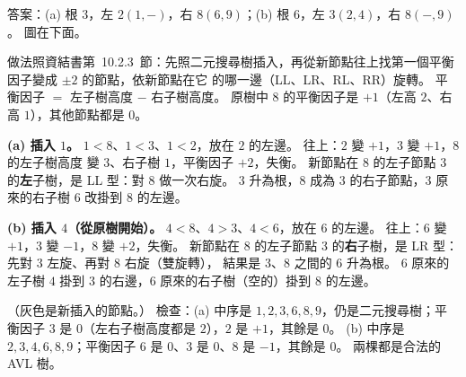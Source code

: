 \begin{pastsoln}
答案：(a) 根 $3$，左 $2(1, -)$，右 $8(6, 9)$；(b) 根 $6$，左 $3(2, 4)$，右 $8(-, 9)$。 圖在下面。

做法照資結書第~10.2.3~節：先照二元搜尋樹插入，再從新節點往上找第一個平衡因子變成 $\pm 2$ 的節點，依新節點在它
的哪一邊（LL、LR、RL、RR）旋轉。 平衡因子 $= $ 左子樹高度 $-$ 右子樹高度。 原樹中 $8$ 的平衡因子是 $+1$（左高
$2$、右高 $1$），其他節點都是 $0$。

\textbf{(a) 插入 $1$。} $1 < 8$、$1 < 3$、$1 < 2$，放在 $2$ 的左邊。 往上：$2$ 變 $+1$，$3$ 變 $+1$，$8$ 的左子樹高度
變 $3$、右子樹 $1$，平衡因子 $+2$，失衡。 新節點在 $8$ 的左子節點 $3$ 的\textbf{左}子樹，是 LL 型：對 $8$ 做一次右旋。
$3$ 升為根，$8$ 成為 $3$ 的右子節點，$3$ 原來的右子樹 $6$ 改掛到 $8$ 的左邊。

\textbf{(b) 插入 $4$（從原樹開始）。} $4 < 8$、$4 > 3$、$4 < 6$，放在 $6$ 的左邊。 往上：$6$ 變 $+1$，$3$ 變 $-1$，$8$
變 $+2$，失衡。 新節點在 $8$ 的左子節點 $3$ 的\textbf{右}子樹，是 LR 型：先對 $3$ 左旋、再對 $8$ 右旋（雙旋轉），
結果是 $3$、$8$ 之間的 $6$ 升為根。 $6$ 原來的左子樹 $4$ 掛到 $3$ 的右邊，$6$ 原來的右子樹（空的）掛到 $8$ 的左邊。

\begin{center}
\end{center}
（灰色是新插入的節點。） 檢查：(a) 中序是 $1, 2, 3, 6, 8, 9$，仍是二元搜尋樹；平衡因子 $3$ 是 $0$（左右子樹高度都是
$2$），$2$ 是 $+1$，其餘是 $0$。 (b) 中序是 $2, 3, 4, 6, 8, 9$；平衡因子 $6$ 是 $0$、$3$ 是 $0$、$8$ 是 $-1$，其餘是 $0$。
兩棵都是合法的 AVL 樹。
\end{pastsoln}
